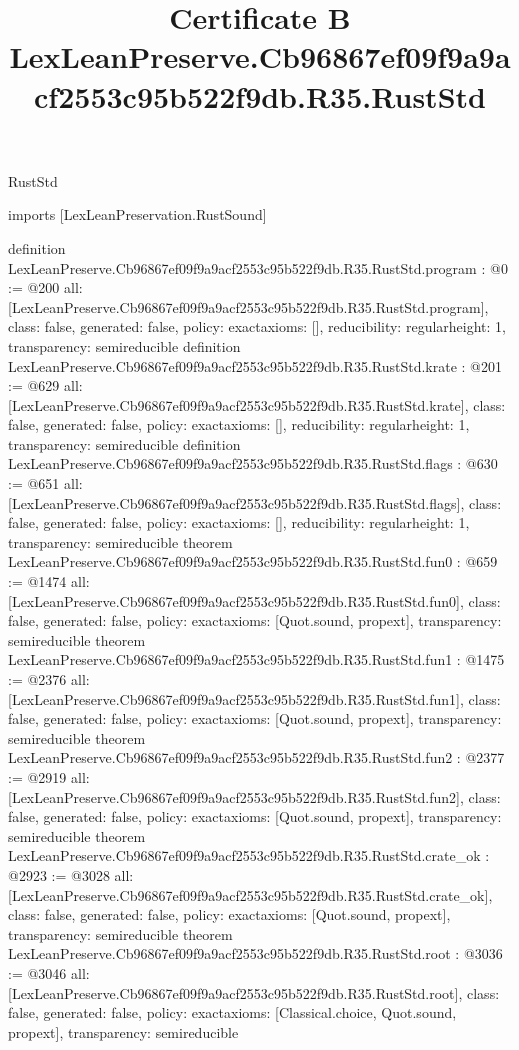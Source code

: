 \begin{lexlean}{RustStd}
\title{Certificate B LexLeanPreserve.Cb96867ef09f9a9acf2553c95b522f9db.R35.RustStd}
\begin{coremodule}
imports [LexLeanPreservation.RustSound]

definition LexLeanPreserve.Cb96867ef09f9a9acf2553c95b522f9db.R35.RustStd.program : @0 := @200 {
  all: [LexLeanPreserve.Cb96867ef09f9a9acf2553c95b522f9db.R35.RustStd.program],
  class: false,
  generated: false,
  policy: exact{axioms: []},
  reducibility: regular{height: 1},
  transparency: semireducible
}
definition LexLeanPreserve.Cb96867ef09f9a9acf2553c95b522f9db.R35.RustStd.krate : @201 := @629 {
  all: [LexLeanPreserve.Cb96867ef09f9a9acf2553c95b522f9db.R35.RustStd.krate],
  class: false,
  generated: false,
  policy: exact{axioms: []},
  reducibility: regular{height: 1},
  transparency: semireducible
}
definition LexLeanPreserve.Cb96867ef09f9a9acf2553c95b522f9db.R35.RustStd.flags : @630 := @651 {
  all: [LexLeanPreserve.Cb96867ef09f9a9acf2553c95b522f9db.R35.RustStd.flags],
  class: false,
  generated: false,
  policy: exact{axioms: []},
  reducibility: regular{height: 1},
  transparency: semireducible
}
theorem LexLeanPreserve.Cb96867ef09f9a9acf2553c95b522f9db.R35.RustStd.fun0 : @659 := @1474 {
  all: [LexLeanPreserve.Cb96867ef09f9a9acf2553c95b522f9db.R35.RustStd.fun0],
  class: false,
  generated: false,
  policy: exact{axioms: [Quot.sound, propext]},
  transparency: semireducible
}
theorem LexLeanPreserve.Cb96867ef09f9a9acf2553c95b522f9db.R35.RustStd.fun1 : @1475 := @2376 {
  all: [LexLeanPreserve.Cb96867ef09f9a9acf2553c95b522f9db.R35.RustStd.fun1],
  class: false,
  generated: false,
  policy: exact{axioms: [Quot.sound, propext]},
  transparency: semireducible
}
theorem LexLeanPreserve.Cb96867ef09f9a9acf2553c95b522f9db.R35.RustStd.fun2 : @2377 := @2919 {
  all: [LexLeanPreserve.Cb96867ef09f9a9acf2553c95b522f9db.R35.RustStd.fun2],
  class: false,
  generated: false,
  policy: exact{axioms: [Quot.sound, propext]},
  transparency: semireducible
}
theorem LexLeanPreserve.Cb96867ef09f9a9acf2553c95b522f9db.R35.RustStd.crate_ok : @2923 := @3028 {
  all: [LexLeanPreserve.Cb96867ef09f9a9acf2553c95b522f9db.R35.RustStd.crate_ok],
  class: false,
  generated: false,
  policy: exact{axioms: [Quot.sound, propext]},
  transparency: semireducible
}
theorem LexLeanPreserve.Cb96867ef09f9a9acf2553c95b522f9db.R35.RustStd.root : @3036 := @3046 {
  all: [LexLeanPreserve.Cb96867ef09f9a9acf2553c95b522f9db.R35.RustStd.root],
  class: false,
  generated: false,
  policy: exact{axioms: [Classical.choice, Quot.sound, propext]},
  transparency: semireducible
}


\end{coremodule}
\end{lexlean}
